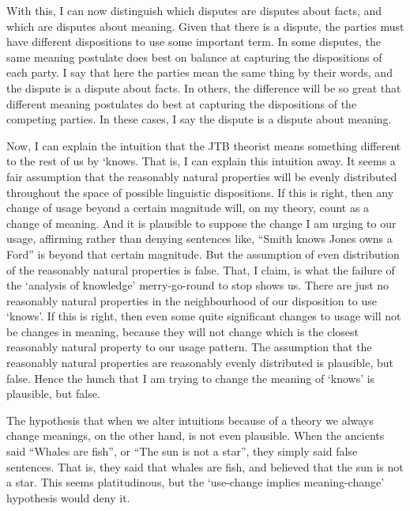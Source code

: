 With this, I can now distinguish which disputes are disputes about facts, and which are disputes about meaning. Given that there is a dispute, the parties must have different dispositions to use some important term. In some disputes, the same meaning postulate does best on balance at capturing the dispositions of each party. I say that here the parties mean the same thing by their words, and the dispute is a dispute about facts. In others, the difference will be so great that different meaning postulates do best at capturing the dispositions of the competing parties. In these cases, I say the dispute is a dispute about meaning.

Now, I can explain the intuition that the JTB theorist means something different to the rest of us by `knows. That is, I can explain this intuition away. It seems a fair assumption that the reasonably natural properties will be evenly distributed throughout the space of possible linguistic dispositions. If this is right, then any change of usage beyond a certain magnitude will, on my theory, count as a change of meaning. And it is plausible to suppose the change I am urging to our usage, affirming rather than denying sentences like, ``Smith knows Jones owns a Ford'' is beyond that certain magnitude. But the assumption of even distribution of the reasonably natural properties is false. That, I claim, is what the failure of the `analysis of knowledge' merry-go-round to stop shows us. There are just no reasonably natural properties in the neighbourhood of our disposition to use `knows'. If this is right, then even some quite significant changes to usage will not be changes in meaning, because they will not change which is the closest reasonably natural property to our usage pattern. The assumption that the reasonably natural properties are reasonably evenly distributed is plausible, but false. Hence the hunch that I am trying to change the meaning of `knows' is plausible, but false.

The hypothesis that when we alter intuitions because of a theory we always change meanings, on the other hand, is not even plausible. When the ancients said ``Whales are fish'', or ``The sun is not a star'', they simply said false sentences. That is, they said that whales are fish, and believed that the sun is not a star. This seems platitudinous, but the `use-change implies meaning\nobreakdash-change' hypothesis would deny it. 

